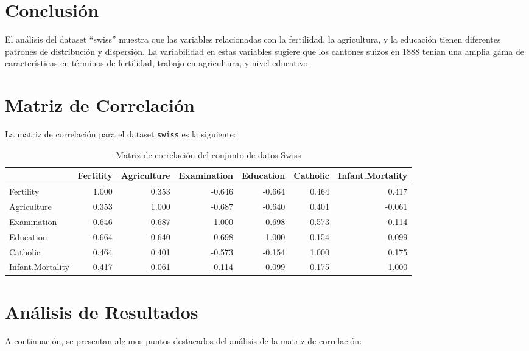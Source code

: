 \documentclass{article}
\begin{document}
\section{Conclusión}
El análisis del dataset ``swiss'' muestra que las variables relacionadas con la fertilidad, la agricultura, y la educación tienen diferentes patrones de distribución y dispersión. La variabilidad en estas variables sugiere que los cantones suizos en 1888 tenían una amplia gama de características en términos de fertilidad, trabajo en agricultura, y nivel educativo.

\section{Matriz de Correlación}

La matriz de correlación para el dataset \texttt{swiss} es la siguiente:

\begin{table}[ht]
    \centering
    \begin{adjustbox}{max width=\textwidth}
    \begin{tabular}{lrrrrrr}
    \hline
     & Fertility & Agriculture & Examination & Education & Catholic & Infant.Mortality \\ 
    \hline
    Fertility & 1.000 & 0.353 & -0.646 & -0.664 & 0.464 & 0.417 \\ 
    Agriculture & 0.353 & 1.000 & -0.687 & -0.640 & 0.401 & -0.061 \\ 
    Examination & -0.646 & -0.687 & 1.000 & 0.698 & -0.573 & -0.114 \\ 
    Education & -0.664 & -0.640 & 0.698 & 1.000 & -0.154 & -0.099 \\ 
    Catholic & 0.464 & 0.401 & -0.573 & -0.154 & 1.000 & 0.175 \\ 
    Infant.Mortality & 0.417 & -0.061 & -0.114 & -0.099 & 0.175 & 1.000 \\ 
    \hline
    \end{tabular}
    \end{adjustbox}
    \caption{Matriz de correlación del conjunto de datos Swiss}
    \label{tab:correlation_matrix_swiss}
\end{table}


\section{Análisis de Resultados}

A continuación, se presentan algunos puntos destacados del análisis de la matriz de correlación:
\end{document}
